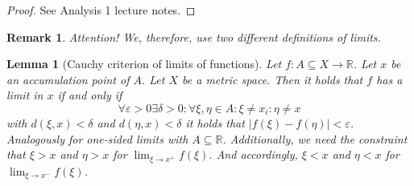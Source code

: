 \documentclass{article}
\newtheorem{lemma}{Lemma}  \numberwithin{lemma}{section}
\newtheorem{remark}{Remark}  \numberwithin{remark}{section}
\newcommand{\card}[1]{\left|#1\right|}
\begin{document}
\begin{proof}
  See Analysis 1 lecture notes.
\end{proof}

\begin{remark}
  Attention! We, therefore, use two different definitions of limits.
\end{remark}

\begin{lemma}[Cauchy criterion of limits of functions] %
  \label{cauchy-crit}
  Let $f: A \subseteq X \to \mathbb R$. Let $x$ be an accumulation point of $A$.
  Let $X$ be a metric space. Then it holds that
  $f$ has a limit in $x$ if and only if
  \[ \forall \varepsilon > 0 \exists \delta > 0: \forall \xi, \eta \in A: \xi \neq x_i: \eta \neq x \]
  with $d(\xi, x) < \delta$ and $d(\eta, x) < \delta$ it holds that $\card{f(\xi) - f(\eta)} < \varepsilon$.
  Analogously for one-sided limits with $A \subseteq \mathbb R$.
  Additionally, we need the constraint that $\xi > x$ and $\eta > x$ for $\lim_{\xi \to x^+} f(\xi)$.
  And accordingly, $\xi < x$ and $\eta < x$ for $\lim_{\xi \to x^-} f(\xi)$.
\end{lemma}
\end{document}
